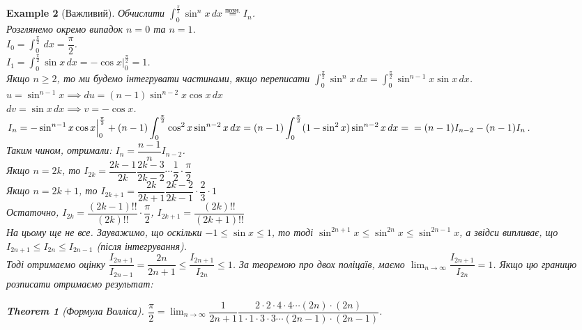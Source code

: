 \documentclass[a4paper, 10pt]{article}
\def\huge{\displaystyle}
\theoremstyle{theoremdd}
\newtheorem{theorem}{Theorem}[subsection]
\theoremstyle{theoremdd}
\theoremstyle{theoremdd}
\theoremstyle{theoremdd}
\theoremstyle{theoremdd}
\newtheorem{example}[theorem]{Example}
\theoremstyle{theoremdd}
\theoremstyle{theoremdd}
\theoremstyle{theoremdd}
\theoremstyle{theoremdd}
\begin{document}
\begin{example}[Важливий]
Обчислити $\huge\int_0^{\frac{\pi}{2}} \sin^n x \,dx \overset{\text{позн.}}{=} I_n$.\\
Розглянемо окремо випадок $n=0$ та $n=1$.\\
$I_0 = \huge\int_0^{\frac{\pi}{2}} \,dx = \dfrac{\pi}{2}$.\\
$I_1 = \huge\int_0^{\frac{\pi}{2}} \sin x\,dx = -\cos x \Big|_0^{\frac{\pi}{2}} = 1$.\\
Якщо $n \geq 2$, то ми будемо інтегрувати частинами, якщо переписати $\huge\int_0^{\frac{\pi}{2}} \sin^n x \,dx = \huge\int_0^{\frac{\pi}{2}} \sin^{n-1} x \sin x \,dx$.\\
$u = \sin^{n-1}x \implies du = (n-1) \sin^{n-2}x \cos x \,dx$\\
$dv = \sin x \,dx \implies v = -\cos x$.\\
$\displaystyle I_n = -\sin^{n-1}x \cos x \Big|_0^{\frac{\pi}{2}} + (n-1)\int_0^{\frac{\pi}{2}} \cos^2 x \sin^{n-2}x\,dx = (n-1)\int_0^{\frac{\pi}{2}} (1-\sin^2 x)\sin^{n-2}x\,dx = \\ = (n-1)I_{n-2} - (n-1)I_n$.\\
Таким чином, отримали: $I_n = \dfrac{n-1}{n}I_{n-2}$.\\
Якщо $n = 2k$, то $I_{2k} = \dfrac{2k-1}{2k} \dfrac{2k-3}{2k-2} \cdots \dfrac{1}{2} \cdot \dfrac{\pi}{2}$\\
Якщо $n = 2k+1$, то $I_{2k+1} = \dfrac{2k}{2k+1} \dfrac{2k-2}{2k-1} \cdot \dfrac{2}{3} \cdot 1$\\
Остаточно, $I_{2k} = \dfrac{(2k-1)!!}{(2k)!!} \cdot \dfrac{\pi}{2}$, \hspace{1cm} $I_{2k+1} = \dfrac{(2k)!!}{(2k+1)!!}$
\bigskip \\
На цьому ще не все. Зауважимо, що оскільки $-1 \leq \sin x \leq 1$, то тоді $\sin^{2n+1} x \leq \sin^{2n} x \leq \sin^{2n-1} x$, а звідси випливає, що $I_{2n+1} \leq I_{2n} \leq I_{2n-1}$ (після інтегрування).\\
Тоді отримаємо оцінку $\dfrac{I_{2n+1}}{I_{2n-1}} = \dfrac{2n}{2n+1} \leq \dfrac{I_{2n+1}}{I_{2n}} \leq 1$. За теоремою про двох поліцаїв, маємо $\huge\lim_{n \to \infty} \dfrac{I_{2n+1}}{I_{2n}} = 1$. Якщо цю границю розписати отримаємо результат:
\begin{theorem}[Формула Волліса]
$\dfrac{\pi}{2} = \huge\lim_{n \to \infty} \dfrac{1}{2n+1} \dfrac{2 \cdot 2 \cdot 4 \cdot 4 \cdots (2n) \cdot (2n)}{1 \cdot 1 \cdot 3 \cdot 3 \cdots (2n-1) \cdot (2n-1)}$.
\end{theorem}


\end{example}
\end{document}
